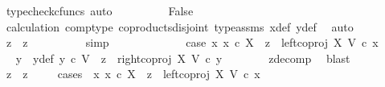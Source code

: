 \begin{isabellebody}
\ {\isacharparenleft}{\kern0pt}typecheck{\isacharunderscore}{\kern0pt}cfuncs{\isacharcomma}{\kern0pt}\ auto{\isacharparenright}{\kern0pt}\isanewline
\ \ \ \ \ \ \isamarkupfalse%
\ \isamarkupfalse%
\ False\isanewline
\ \ \ \ \ \ \ \ \isamarkupfalse%
\ calculation\ comp{\isacharunderscore}{\kern0pt}type\ coproducts{\isacharunderscore}{\kern0pt}disjoint\ type{\isacharunderscore}{\kern0pt}assms\ x{}{\isacharunderscore}{\kern0pt}def\ y{}{\isacharunderscore}{\kern0pt}def\ \isamarkupfalse%
\ auto\isanewline
\ \ \ \ \ \ \isamarkupfalse%
\ \isamarkupfalse%
\ {\isachardoublequoteopen}z{}\ {\isacharequal}{\kern0pt}\ z{}{\isachardoublequoteclose}\isanewline
\ \ \ \ \ \ \ \ \isamarkupfalse%
\ simp\isanewline
\ \ \ \ \isamarkupfalse%
\isanewline
\ \ \isamarkupfalse%
\isanewline
\ \ \ \ \isamarkupfalse%
\ case{}{\isacharcolon}{\kern0pt}\ {\isachardoublequoteopen}{\isasymnexists}x{}{\isachardot}{\kern0pt}\ x{}\ {\isasymin}\isactrlsub c\ X\ {\isasymand}\ z{}\ {\isacharequal}{\kern0pt}\ left{\isacharunderscore}{\kern0pt}coproj\ X\ V\ {\isasymcirc}\isactrlsub c\ x{}{\isachardoublequoteclose}\isanewline
\ \ \ \ \isamarkupfalse%
\ \isamarkupfalse%
\ y{}\ \ y{}{\isacharunderscore}{\kern0pt}def{\isacharcolon}{\kern0pt}\ {\isachardoublequoteopen}y{}\ {\isasymin}\isactrlsub c\ V\ {\isasymand}\ z{}\ {\isacharequal}{\kern0pt}\ right{\isacharunderscore}{\kern0pt}coproj\ X\ V\ {\isasymcirc}\isactrlsub c\ y{}{\isachardoublequoteclose}\isanewline
\ \ \ \ \ \ \isamarkupfalse%
\ z{}{\isacharunderscore}{\kern0pt}decomp\ \isamarkupfalse%
\ blast\isanewline
\ \ \ \ \isamarkupfalse%
\ {\isachardoublequoteopen}z{}\ {\isacharequal}{\kern0pt}\ z{}{\isachardoublequoteclose}\isanewline
\ \ \ \ \isamarkupfalse%
{\isacharparenleft}{\kern0pt}cases\ {\isachardoublequoteopen}{\isasymexists}\ x{}{\isachardot}{\kern0pt}\ x{}\ {\isasymin}\isactrlsub c\ X\ {\isasymand}\ z{}\ {\isacharequal}{\kern0pt}\ left{\isacharunderscore}{\kern0pt}coproj\ X\ V\ {\isasymcirc}\isactrlsub c\ x{}{\isachardoublequoteclose}{\isacharparenright}{\kern0pt}\isanewline
\ \ \ \ \ \ \isamarkupfalse%

\end{isabellebody}
